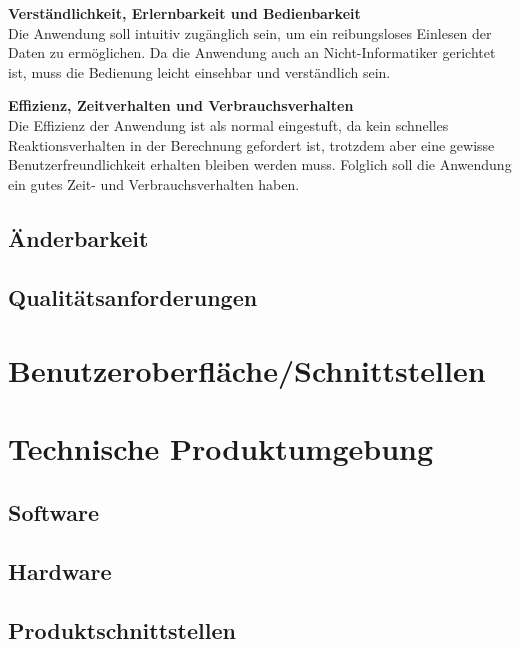 \documentclass[parskip=full]{scrartcl} %
\begin{document}
\textbf{Verständlichkeit, Erlernbarkeit und Bedienbarkeit}\\
Die Anwendung soll intuitiv zugänglich sein, um ein reibungsloses Einlesen der Daten zu ermöglichen. Da die Anwendung auch an Nicht-Informatiker gerichtet ist, muss die Bedienung leicht einsehbar und verständlich sein.

\textbf{Effizienz, Zeitverhalten und Verbrauchsverhalten}\\
Die Effizienz der Anwendung ist als normal eingestuft, da kein schnelles Reaktionsverhalten in der Berechnung gefordert ist, trotzdem aber eine gewisse Benutzerfreundlichkeit erhalten bleiben werden muss. Folglich soll die Anwendung ein gutes Zeit- und Verbrauchsverhalten haben.
\subsection{Änderbarkeit}
\subsection{Qualitätsanforderungen}


\newpage



\section{Benutzeroberfläche/Schnittstellen}
\newpage



\section{Technische Produktumgebung}

\subsection{Software}
\subsection{Hardware}
\subsection{Produktschnittstellen}
\newpage
\end{document}
